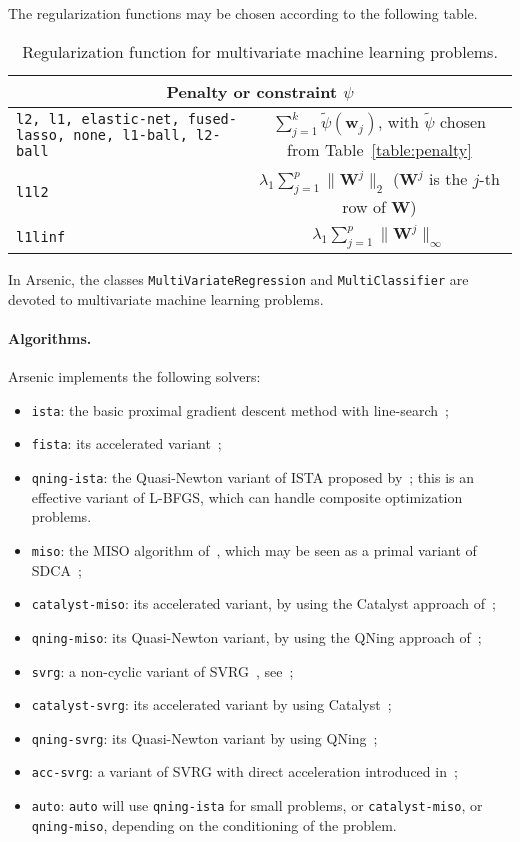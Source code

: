\documentclass{article}
\def\w{{\mathbf{w}}}
\def\W{{\mathbf{W}}}
\begin{document}
The regularization functions may be chosen according to the following table.
\begin{table}[h!]
   \centering
   \begin{tabular}{|p{5cm}|c|}
      \hline
      \multicolumn{2}{|c|}{Penalty or constraint $\psi$}     \\  
      \hline
      \texttt{l2, l1, elastic-net, fused-lasso, none, l1-ball, l2-ball} & 
      $\sum_{j=1}^k \tilde{\psi}(\w_j)$, with $\tilde{\psi}$ chosen from Table~\ref{table:penalty} \\
      \hline
      \texttt{l1l2} & $\lambda_1 \sum_{j=1}^p \| \W^j\|_2$ ($\W^j$ is the $j$-th row of $\W$) \\ 
      \hline
      \texttt{l1linf} & $\lambda_1 \sum_{j=1}^p \| \W^j\|_\infty$  \\ 
      \hline
   \end{tabular}
   \caption{Regularization function for multivariate machine learning problems.}
\end{table}

In Arsenic, the classes \texttt{MultiVariateRegression} and \texttt{MultiClassifier} are devoted to multivariate machine learning problems.

\paragraph{Algorithms.}
Arsenic implements the following solvers:
\begin{itemize}
   \item \texttt{ista}: the basic proximal gradient descent method with line-search~\citep[see][]{fista};
   \item \texttt{fista}: its accelerated variant~\citep{fista};
   \item \texttt{qning-ista}: the Quasi-Newton variant of ISTA proposed by~\citet{lin2019inexact}; this is an effective variant of L-BFGS, which can handle composite optimization problems.
   \item \texttt{miso}: the MISO algorithm of~\citet{miso}, which may be seen as a primal variant of SDCA~\citep{sdca};
   \item \texttt{catalyst-miso}: its accelerated variant, by using the Catalyst approach of~\citet{lin2018catalyst};
   \item \texttt{qning-miso}: its Quasi-Newton variant, by using the QNing approach of~\citet{lin2019inexact};
   \item \texttt{svrg}: a non-cyclic variant of SVRG~\citep{proxsvrg}, see~\citep{kulunchakov2019estimate};
   \item \texttt{catalyst-svrg}: its accelerated variant by using Catalyst~\citep{lin2018catalyst};
   \item \texttt{qning-svrg}: its Quasi-Newton variant by using QNing~\citep{lin2019inexact};
   \item \texttt{acc-svrg}: a variant of SVRG with direct acceleration introduced in~\citep{kulunchakov2019estimate};
   \item \texttt{auto}: \texttt{auto} will use \texttt{qning-ista} for small problems, or \texttt{catalyst-miso}, or \texttt{qning-miso}, depending on the conditioning of the problem.
\end{itemize}
\end{document}
